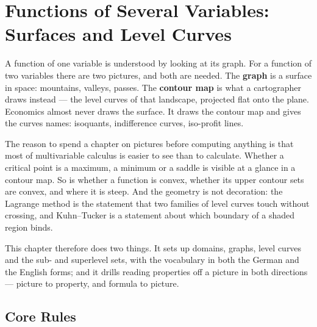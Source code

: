 \chapter{Functions of Several Variables: Surfaces and Level Curves}

A function of one variable is understood by looking at its graph. For a
function of two variables there are two pictures, and both are needed. The
\textbf{graph} is a surface in space: mountains, valleys, passes. The
\textbf{contour map} is what a cartographer draws instead --- the level
curves of that landscape, projected flat onto the plane. Economics almost
never draws the surface. It draws the contour map and gives the curves
names: isoquants, indifference curves, iso-profit lines.

The reason to spend a chapter on pictures before computing anything is that
most of multivariable calculus is easier to see than to calculate. Whether a
critical point is a maximum, a minimum or a saddle is visible at a glance in
a contour map. So is whether a function is convex, whether its upper contour
sets are convex, and where it is steep. And the geometry is not decoration:
the Lagrange method is the statement that two families of level curves touch
without crossing, and Kuhn--Tucker is a statement about which boundary of a
shaded region binds.

This chapter therefore does two things. It sets up domains, graphs, level
curves and the sub- and superlevel sets, with the vocabulary in both the
German and the English forms; and it drills reading properties off a picture
in both directions --- picture to property, and formula to picture.

\section{Core Rules}


